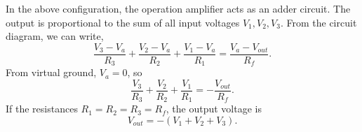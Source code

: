 \documentclass[12pt]{article}
\begin{document}
In the above configuration, the operation amplifier acts as an adder circuit. The output is proportional to the sum of all input voltages $ V_1, V_2, V_3 $.
From the circuit diagram, we can write,
\begin{equation*}
	\frac{V_3 - V_a}{R_3} + \frac{V_2 - V_a}{R_2} + \frac{V_1 - V_a}{R_1} = \frac{V_a - V_{out}}{R_f}.
\end{equation*}
From virtual ground, $ V_a = 0 $, so 
\begin{equation*}
	\frac{V_3}{R_3} + \frac{V_2}{R_2} + \frac{V_1}{R_1} = - \frac{V_{out}}{R_f}.
\end{equation*}
If the resistances $ R_1 = R_2 = R_3 = R_f  $, the output voltage is 
\begin{equation*}
	V_{out} = -(V_1 + V_2 + V_3).
\end{equation*}
\end{document}
